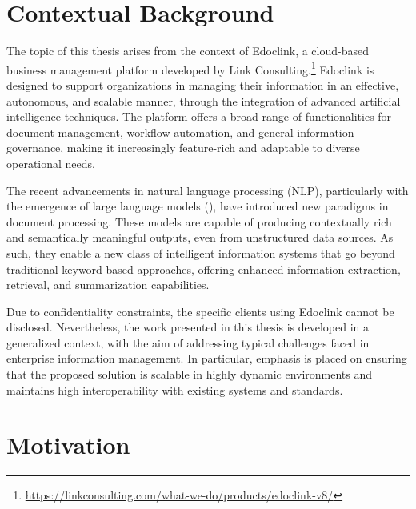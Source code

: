 \cleardoublepage
\label{chap:intro}
\section{Contextual Background}
The topic of this thesis arises from the context of Edoclink, a cloud-based business management platform developed by Link Consulting.\footnote{\url{https://linkconsulting.com/what-we-do/products/edoclink-v8/}} Edoclink is designed to support organizations in managing their information in an effective, autonomous, and scalable manner, through the integration of advanced artificial intelligence techniques. The platform offers a broad range of functionalities for document management, workflow automation, and general information governance, making it increasingly feature-rich and adaptable to diverse operational needs.

The recent advancements in natural language processing (NLP), particularly with the emergence of large language models (), have introduced new paradigms in document processing. These models are capable of producing contextually rich and semantically meaningful outputs, even from unstructured data sources. As such, they enable a new class of intelligent information systems that go beyond traditional keyword-based approaches, offering enhanced information extraction, retrieval, and summarization capabilities.

Due to confidentiality constraints, the specific clients using Edoclink cannot be disclosed. Nevertheless, the work presented in this thesis is developed in a generalized context, with the aim of addressing typical challenges faced in enterprise information management. In particular, emphasis is placed on ensuring that the proposed solution is scalable in highly dynamic environments and maintains high interoperability with existing systems and standards.

\section{Motivation}


